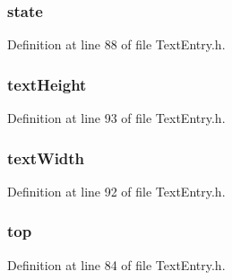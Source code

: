 \subsubsection[{state}]{ state}\label{struct_k_e_y_m_e_m_b_e_r_a5d717a64978f34c9afb8ae23374160a0}


Definition at line 88 of file Text\+Entry.\+h.

\hypertarget{struct_k_e_y_m_e_m_b_e_r_a40fa9c35391b0005032180b85e7afd34}{}
\subsubsection[{text\+Height}]{ text\+Height}\label{struct_k_e_y_m_e_m_b_e_r_a40fa9c35391b0005032180b85e7afd34}


Definition at line 93 of file Text\+Entry.\+h.

\hypertarget{struct_k_e_y_m_e_m_b_e_r_a9fbde8f74d930599fd9206a263e46cd6}{}
\subsubsection[{text\+Width}]{ text\+Width}\label{struct_k_e_y_m_e_m_b_e_r_a9fbde8f74d930599fd9206a263e46cd6}


Definition at line 92 of file Text\+Entry.\+h.

\hypertarget{struct_k_e_y_m_e_m_b_e_r_ae53b6204fda5d3270bd1a3aba7a88eab}{}
\subsubsection[{top}]{ top}\label{struct_k_e_y_m_e_m_b_e_r_ae53b6204fda5d3270bd1a3aba7a88eab}


Definition at line 84 of file Text\+Entry.\+h.

\hypertarget{struct_k_e_y_m_e_m_b_e_r_ae0027ff2f19db0b2b4959a23b34ff53f}{}
